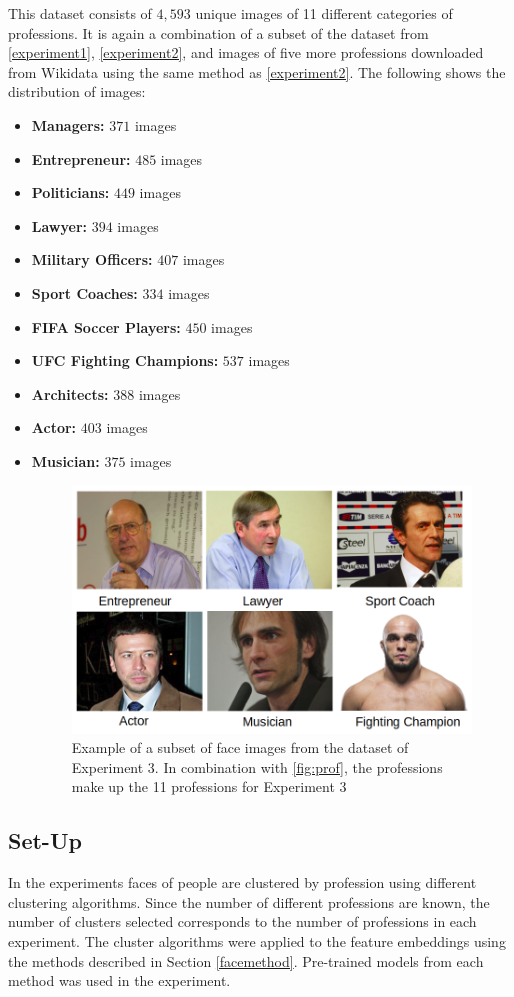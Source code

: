 \documentclass[12pt,english]{article}
\begin{document}
\quad
This dataset consists of $4,593$ unique images of 11 different categories of professions. It is again a combination of a subset of the dataset from \ref{experiment1}, \ref{experiment2}, and images of five more professions downloaded from Wikidata using the same method as \ref{experiment2}. The following shows the distribution of images:

\begin{itemize}
\item \textbf{Managers: } $371$ images
\item \textbf{Entrepreneur: } $485$ images
\item \textbf{Politicians: } $449$ images
\item \textbf{Lawyer: } $394$ images
\item \textbf{Military Officers: } $407$ images
\item \textbf{Sport Coaches: } $334$ images
\item \textbf{FIFA Soccer Players: } $450$ images
\item \textbf{UFC Fighting Champions: } $537$ images
\item \textbf{Architects: } $388$ images
\item \textbf{Actor: } $403$ images
\item \textbf{Musician: } $375$ images

\begin{figure}[!tbp]
 \centering
    \includegraphics[width=0.7\columnwidth]{figures/ex3.png}
    \caption{Example of a subset of face images from the dataset of Experiment 3. In combination with \ref{fig:prof}, the professions make up the 11 professions for Experiment 3}
\end{figure}

\end{itemize}


\subsection{Set-Up}
\quad
In the experiments faces of people are clustered by profession using different clustering algorithms. Since the number of different professions are known, the number of clusters selected corresponds to the number of professions in each experiment. The cluster algorithms were applied to the feature embeddings using the methods described in Section \ref{facemethod}. Pre-trained models from each method was used in the experiment. 
\end{document}
